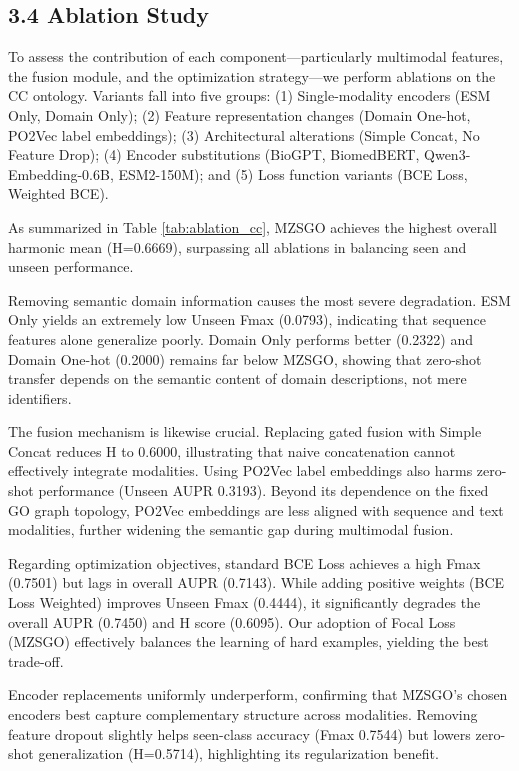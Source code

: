 \documentclass[unnumsec,webpdf,contemporary,large]{oup-authoring-template}%
\theoremstyle{thmstyleone}%
\theoremstyle{thmstyletwo}%
\theoremstyle{thmstylethree}%
\begin{document}
\subsection{3.4 Ablation Study}

To assess the contribution of each component—particularly multimodal features, the fusion module, and the optimization strategy—we perform ablations on the CC ontology. Variants fall into five groups: (1) Single-modality encoders (ESM Only, Domain Only); (2) Feature representation changes (Domain One-hot, PO2Vec label embeddings); (3) Architectural alterations (Simple Concat, No Feature Drop); (4) Encoder substitutions (BioGPT\citep{luo2022biogpt}, BiomedBERT\citep{chakraborty2020biomedbert}, Qwen3-Embedding-0.6B, ESM2-150M); and (5) Loss function variants (BCE Loss, Weighted BCE).

As summarized in Table \ref{tab:ablation_cc}, MZSGO achieves the highest overall harmonic mean (H=0.6669), surpassing all ablations in balancing seen and unseen performance.

Removing semantic domain information causes the most severe degradation. ESM Only yields an extremely low Unseen Fmax (0.0793), indicating that sequence features alone generalize poorly. Domain Only performs better (0.2322) and Domain One-hot (0.2000) remains far below MZSGO, showing that zero-shot transfer depends on the semantic content of domain descriptions, not mere identifiers.

The fusion mechanism is likewise crucial. Replacing gated fusion with Simple Concat reduces H to 0.6000, illustrating that naive concatenation cannot effectively integrate modalities. Using PO2Vec label embeddings also harms zero-shot performance (Unseen AUPR 0.3193). Beyond its dependence on the fixed GO graph topology, PO2Vec embeddings are less aligned with sequence and text modalities, further widening the semantic gap during multimodal fusion.

Regarding optimization objectives, standard BCE Loss achieves a high Fmax (0.7501) but lags in overall AUPR (0.7143). While adding positive weights (BCE Loss Weighted) improves Unseen Fmax (0.4444), it significantly degrades the overall AUPR (0.7450) and H score (0.6095). Our adoption of Focal Loss (MZSGO) effectively balances the learning of hard examples, yielding the best trade-off.

Encoder replacements uniformly underperform, confirming that MZSGO’s chosen encoders best capture complementary structure across modalities. Removing feature dropout slightly helps seen-class accuracy (Fmax 0.7544) but lowers zero-shot generalization (H=0.5714), highlighting its regularization benefit.
\end{document}
